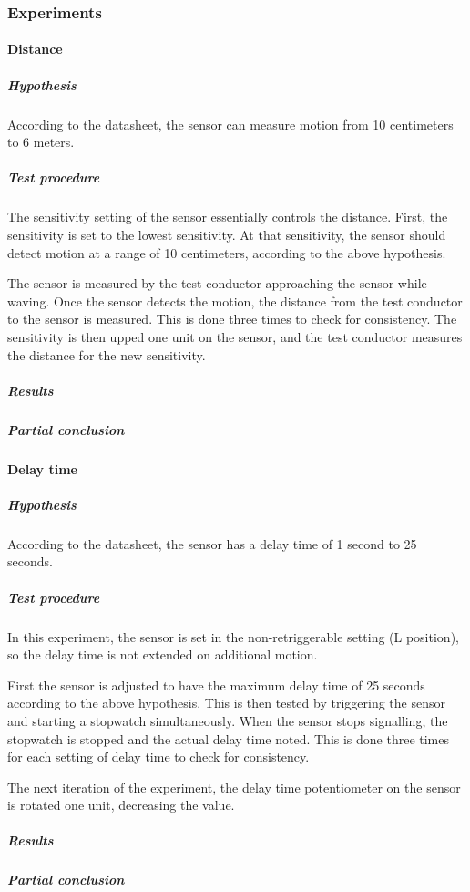 \subsubsection{Experiments}

\paragraph{Distance}

\subparagraph{Hypothesis}

According to the datasheet, the sensor can measure motion from 10 centimeters to
6 meters.

\subparagraph{Test procedure}

The sensitivity setting of the sensor essentially controls the distance. First,
the sensitivity is set to the lowest sensitivity. At that sensitivity, the
sensor should detect motion at a range of 10 centimeters, according to the above
hypothesis.

The sensor is measured by the test conductor approaching the sensor while
waving. Once the sensor detects the motion, the distance from the test conductor
to the sensor is measured. This is done three times to check for consistency. The sensitivity is then upped one unit on the sensor,
and the test conductor measures the distance for the new sensitivity.

\subparagraph{Results}

\subparagraph{Partial conclusion}



\paragraph{Delay time}

\subparagraph{Hypothesis}

According to the datasheet, the sensor has a delay time of 1 second to 25 seconds.

\subparagraph{Test procedure}

In this experiment, the sensor is set in the non-retriggerable setting (L
position), so the delay time is not extended on additional motion.

First the sensor is adjusted to have the maximum delay time of 25 seconds
according to the above hypothesis. This is then tested by triggering the sensor
and starting a stopwatch simultaneously. When the sensor stops signalling, the
stopwatch is stopped and the actual delay time noted. This is done three times
for each setting of delay time to check for consistency.

The next iteration of the experiment, the delay time potentiometer on the sensor
is rotated one unit, decreasing the value.

\subparagraph{Results}

\subparagraph{Partial conclusion}